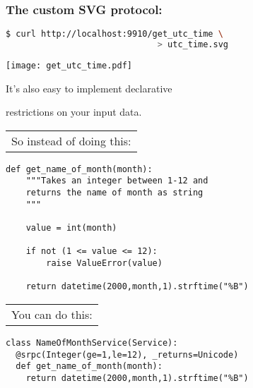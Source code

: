 \documentclass{beamer}
\begin{document}
\begin{frame}[fragile]
\frametitle{The custom SVG protocol:}

  \begin{lstlisting}[language=sh]
$ curl http://localhost:9910/get_utc_time \
                              > utc_time.svg
  \end{lstlisting}

  \begin{center}
    \texttt{[image: get\_utc\_time.pdf]}
  \end{center}
\end{frame}

\begin{frame}

  \begin{center}
  \LARGE
    It's also easy to implement declarative

    \bigskip

    restrictions on your input data.
  \end{center}

\end{frame}

\begin{frame}[fragile]
  \begin{tabular}{l}
  \LARGE So instead of doing this:
  \end{tabular}

  \bigskip

  \begin{lstlisting}
def get_name_of_month(month):
    """Takes an integer between 1-12 and
    returns the name of month as string
    """

    value = int(month)

    if not (1 <= value <= 12):
        raise ValueError(value)

    return datetime(2000,month,1).strftime("%B")
  \end{lstlisting}
\end{frame}

\begin{frame}[fragile]
  \begin{tabular}{l}
  \LARGE You can do this:
  \end{tabular}

  \bigskip

  \begin{lstlisting}[emph={Integer,le,ge}]
class NameOfMonthService(Service):
  @srpc(Integer(ge=1,le=12), _returns=Unicode)
  def get_name_of_month(month):
    return datetime(2000,month,1).strftime("%B")
  \end{lstlisting}
\end{frame}
\end{document}
